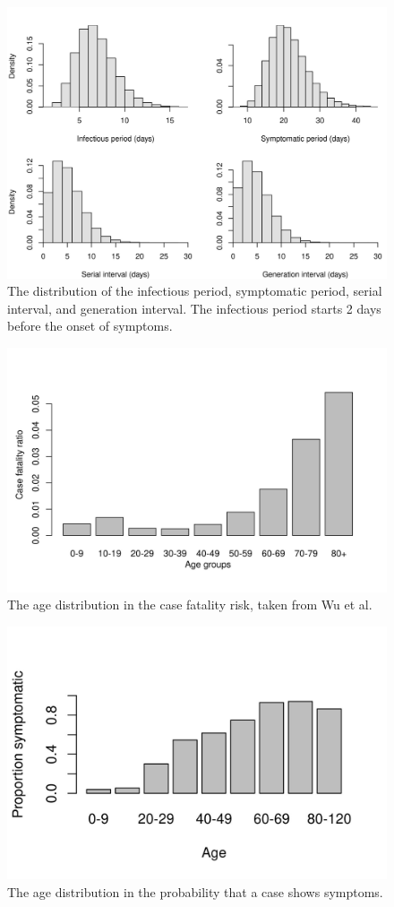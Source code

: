 \documentclass[11pt]{article}
\begin{document}
\begin{figure}[hb!]
\centering
\includegraphics[width=\textwidth]{../figures/report_figure_parameter_periods.jpeg} 
\caption{\label{fig_params_periods}The distribution of the infectious period, symptomatic period, serial interval, and generation interval. The infectious period starts 2 days before the onset of symptoms.}
\end{figure}


\begin{figure}[hb!]
\centering
\includegraphics[width=\textwidth]{../figures/report_figure_age_CFR.jpeg} 
\caption{\label{fig_age_cfr} The age distribution in the case fatality risk, taken from Wu et al.}
\end{figure}

\begin{figure}[hb!]
\centering
\includegraphics[width=\textwidth]{../figures/report_figure_age_symptoms.jpeg} 
\caption{\label{fig_age_symp} The age distribution in the probability that a case shows symptoms.}
\end{figure}
\end{document}
